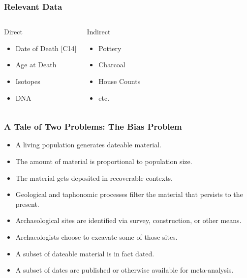 \documentclass{beamer}
\begin{document}
\begin{frame}[t]
  \frametitle{Relevant Data}
  \begin{columns}[c]
     \begin{block}{Direct}
     \begin{itemize}
       \pause
       \item{Date of Death [C14]} 
       \pause
       \item{Age at Death} 
       \pause
       \item{Isotopes} 
       \pause
       \item{DNA} 
     \end{itemize}
     \end{block}
    \pause

     \begin{block}{Indirect}
     \begin{itemize}
       \pause
       \item{Pottery} 
       \pause
       \item{Charcoal} 
       \pause
       \item{House Counts} 
       \pause
       \item{etc.} 
     \end{itemize}
     \end{block}
  \end{columns}
\end{frame}

\begin{frame}[t]
  \frametitle{A Tale of Two Problems: The Bias Problem}
  \pause
  \begin{itemize}
    \item A living population generates dateable material.
    \pause
    \item The amount of material is proportional to population size.
    \pause
    \item The material gets deposited in recoverable contexts.
    \pause
    \item Geological and taphonomic processes filter the material that persists to the present.
    \pause
    \item Archaeological sites are identified via survey, construction, or other means.
    \pause
    \item Archaeologists choose to excavate some of those sites.
    \pause
    \item A subset of dateable material is in fact dated.
    \pause
    \item A subset of dates are published or otherwise available for meta-analysis. 
    \pause
  \end{itemize}
\end{frame}
\end{document}
